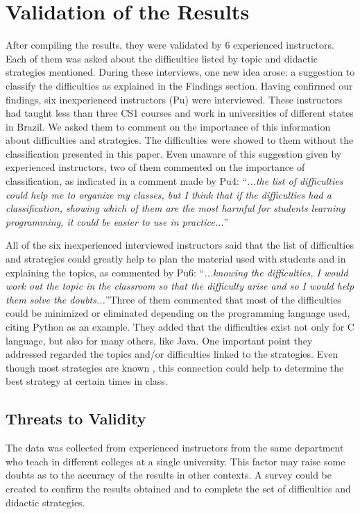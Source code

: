 \documentclass[sigconf]{acmart}
\begin{document}
\section{Validation of the Results}
After compiling the results, they were validated by 6 experienced instructors. Each of them was asked about the difficulties listed by topic and didactic strategies mentioned. During these interviews, one new idea arose: a suggestion to classify the difficulties as explained in the Findings section. Having confirmed our findings, six inexperienced instructors (Pu) were interviewed. These instructors had taught less than three CS1 courses and work in universities of different states in Brazil. We asked them to comment on the importance of this information about difficulties and strategies. The difficulties were showed to them without the classification presented in this paper. Even unaware of this suggestion given by experienced instructors, two of them commented on the importance of classification, as indicated in a comment made by Pu4:  \textquotedblleft \textit{...the list of difficulties could help me to organize my classes, but I think that if the difficulties had a classification, showing which of them are the most harmful for students learning programming, it could be easier to use in practice...}\textquotedblright 

All of the six inexperienced interviewed instructors said that the list of difficulties and strategies could greatly help to plan the material used with students and in explaining the topics, as commented by Pu6: \textquotedblleft \textit{...knowing the difficulties, I would work out the topic in the classroom so that the difficulty arise and so I would help them solve the doubts...}\textquotedblright \space Three of them commented that most of the difficulties could be minimized or eliminated depending on the programming language used, citing Python as an example. They added that the difficulties exist not only for C language, but also for many others, like Java. One important point they addressed regarded the topics and/or difficulties linked to the strategies.  Even though most strategies are known , this connection could help to determine the best strategy at certain times in class.

\subsection{Threats to Validity}
The data was collected from experienced instructors from the same department who teach in different colleges at a single university. This factor may raise some doubts as to the accuracy of the results in other contexts. A survey could be created to confirm the results obtained and to complete the set of difficulties and didactic strategies. 
\end{document}
